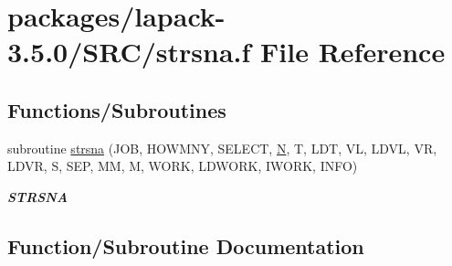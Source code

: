 \hypertarget{strsna_8f}{}\section{packages/lapack-\/3.5.0/\+S\+R\+C/strsna.f File Reference}
\label{strsna_8f}
\subsection*{Functions/\+Subroutines}
\begin{DoxyCompactItemize}
\item 
subroutine \hyperlink{strsna_8f_ae25a02f27cf6ca3c311bbabe2be61046}{strsna} (J\+O\+B, H\+O\+W\+M\+N\+Y, S\+E\+L\+E\+C\+T, \hyperlink{polmisc_8c_a0240ac851181b84ac374872dc5434ee4}{N}, T, L\+D\+T, V\+L, L\+D\+V\+L, V\+R, L\+D\+V\+R, S, S\+E\+P, M\+M, M, W\+O\+R\+K, L\+D\+W\+O\+R\+K, I\+W\+O\+R\+K, I\+N\+F\+O)
\begin{DoxyCompactList}\small\item\em {\bfseries S\+T\+R\+S\+N\+A} \end{DoxyCompactList}\end{DoxyCompactItemize}


\subsection{Function/\+Subroutine Documentation}
\hypertarget{strsna_8f_ae25a02f27cf6ca3c311bbabe2be61046}{}
